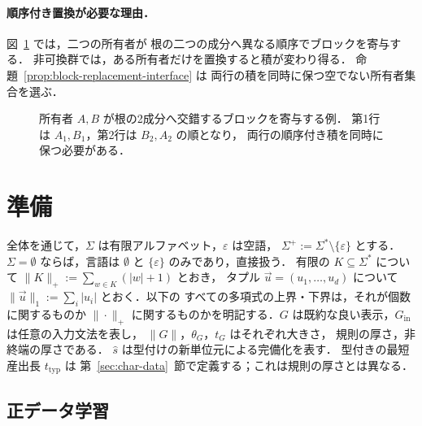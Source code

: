 \documentclass[11pt,a4paper]{ltjsarticle}
\numberwithin{equation}{section}
\theoremstyle{plain}
\theoremstyle{definition}
\theoremstyle{remark}
\newcommand{\tuple}[1]{\vec{#1}}
\newcommand{\eps}{\varepsilon}
\theoremstyle{plain}
\begin{document}
\paragraph{順序付き置換が必要な理由．}
図~\ref{fig:interleaved-blocks} では，二つの所有者が
根の二つの成分へ異なる順序でブロックを寄与する．
非可換群では，ある所有者だけを置換すると積が変わり得る．
命題~\ref{prop:block-replacement-interface} は
両行の積を同時に保つ空でない所有者集合を選ぶ．
\begin{figure}[t]
\centering
{}
\caption{所有者 $A,B$ が根の2成分へ交錯するブロックを寄与する例．
第1行は $A_1,B_1$，第2行は $B_2,A_2$ の順となり，
両行の順序付き積を同時に保つ必要がある．}
\label{fig:interleaved-blocks}
\end{figure}

\section{準備}
\label{sec:prelim}

全体を通じて，$\Sigma$ は有限アルファベット，$\eps$ は空語，
$\Sigma^+:=\Sigma^*\setminus\{\eps\}$ とする．$\Sigma=\emptyset$ ならば，言語は
$\emptyset$ と $\{\eps\}$ のみであり，直接扱う．
有限の $K\subseteq\Sigma^*$ について $\|K\|_+:=\sum_{w\in K}(|w|+1)$ とおき，
タプル $\tuple u=(u_1,\ldots,u_d)$ について $\|\tuple u\|_1:=\sum_i|u_i|$ とおく．以下の
すべての多項式の上界・下界は，それが個数に関するものか
$\|\cdot\|_+$ に関するものかを明記する．$G$ は既約な良い表示，$G_{\mathrm{in}}$ は任意の入力文法を表し，
$\|G\|$，$\theta_G$，$t_G$ はそれぞれ大きさ，
規則の厚さ，非終端の厚さである．
$\widehat s$ は型付けの新単位元による完備化を表す．
型付きの最短産出長 $t_{\mathrm{typ}}$ は
第~\ref{sec:char-data}~節で定義する；これは規則の厚さとは異なる．

\subsection{正データ学習}
\end{document}
